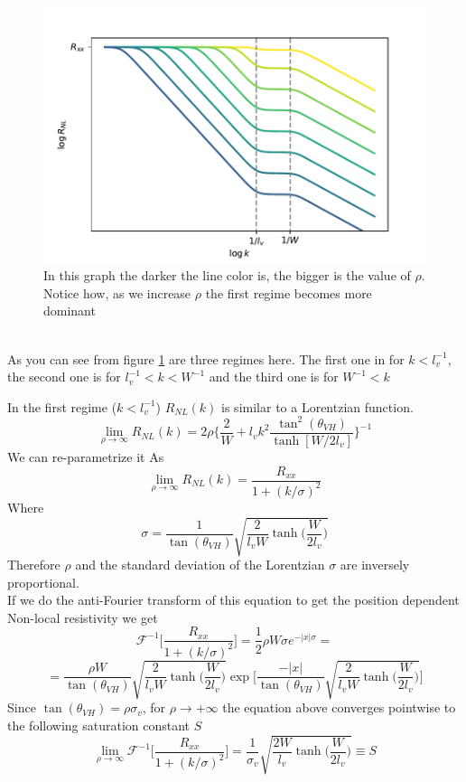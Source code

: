 \begin{figure}[h!]
    \centering
    \includegraphics[width=\linewidth]{Immagini/rnl/rho2.pdf}
    \caption{In this graph the darker the line color is, the bigger is the value of $\rho$. Notice how, as we increase $\rho$ the first regime becomes more dominant}
    \label{fig:rho2}
\end{figure}\\

As you can see from figure \ref{fig:rho2} are three regimes here. The first one in for $k<l_v^{-1}$, the second one is for $l_v^{-1}<k<W^{-1}$ and the third one is for $W^{-1}<k$

In the first regime ($k< l_v^{-1}$) $R_{NL}(k)$ is similar to a Lorentzian function.
\begin{equation}
    \lim_{\rho\to\infty} R_{NL}(k)=2\rho
    \bigg\{
        \frac 2W+ l_vk^2\frac{\tan^2(\theta_{VH})}{\tanh[W/2l_v]}  
    \bigg\}^{-1}
\end{equation}
We can re-parametrize it As
\begin{equation}
    \lim_{\rho\to\infty} R_{NL}(k)=\frac{R_{xx}}{1+(k/\sigma)^2}
\end{equation}
Where 
\[
    \sigma=\frac 1 {\tan(\theta_{VH})}\sqrt{\frac 2{l_vW} \tanh\bigg(\frac W{2l_v}\bigg)}
\]
Therefore $\rho$ and the standard deviation of the Lorentzian $\sigma$ are inversely proportional.\\
If we do the anti-Fourier transform of this equation to get the position dependent Non-local resistivity we get 
\[
    \mathcal F^{-1}\bigg[\frac{R_{xx}}{1+(k/\sigma)^2} \bigg]=\frac 12\rho W\sigma {e^{-|x|\sigma}}=
\]
\begin{equation}
    =\frac {\rho W}{\tan(\theta_{VH})}\sqrt{\frac 2{l_v W}\tanh\bigg(\frac W{2l_v}\bigg)}
    \exp\Bigg[
        \frac{-|x|}{\tan(\theta_{VH})}\sqrt{\frac 2{l_v W}\tanh\bigg(\frac W{2l_v}\bigg)}
    \Bigg]
\end{equation}
Since $\tan(\theta_{VH})=\rho \sigma_v$, for $\rho\to +\infty$ the equation above converges pointwise to the following saturation constant $S$
\begin{equation}
    \lim_{\rho\to\infty}\mathcal F^{-1}\bigg[\frac{R_{xx}}{1+(k/\sigma)^2} \bigg]=\frac 1{\sigma_v}\sqrt{\frac {2W}{l_v}\tanh\bigg(\frac W{2l_v} \bigg)}\equiv S
\end{equation}


